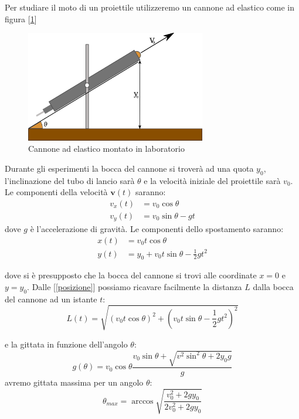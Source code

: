 \documentclass[a4paper,10pt,oneside]{article}
\begin{document}
Per studiare il moto di un proiettile utilizzeremo un cannone ad elastico come in figura [\ref{fig:cannone1}]
\begin{figure}[H]
 \centering
 \includegraphics[width=0.7\textwidth]{./Immagini/cannone.png}
 \caption{Cannone ad elastico montato in laboratorio}
 \label{fig:cannone1}
\end{figure}
Durante gli esperimenti la bocca del cannone si troverà ad una quota $y_0$, l'inclinazione del tubo di lancio sarà $\theta$ e la velocità iniziale del proiettile sarà $v_0$. Le componenti della velocità $\mathbf{v}(t)$ saranno:
\begin{align}
 v_x(t)&=v_0\cos \theta\\
 v_y(t)&=v_0\sin\theta -gt
\end{align}
dove $g$ è l'accelerazione di gravità. Le componenti dello spostamento saranno:
\begin{align}\label{posizione}
 x(t)&=v_0t\cos\theta\\
 y(t)&=y_0+v_0t\sin \theta -\frac{1}{2} g t^2
\end{align}

dove si è presupposto che la bocca del cannone si trovi alle coordinate $x=0$ e $y=y_0$. Dalle [\ref{posizione}] possiamo ricavare facilmente la distanza $L$ dalla bocca del cannone ad un istante $t$:
\begin{equation}
 L(t)=\sqrt{(v_0 t\cos\theta )^2+(v_0t \sin \theta-\frac 1 2 g t^2)^2}
\end{equation}

e la gittata in  funzione dell'angolo $\theta$:
\begin{equation}
 g(\theta)=v_0\cos \theta\frac{v_0\sin\theta+\sqrt{v^2\sin^2\theta+2 y_0 g}}{g}
\end{equation}
avremo gittata massima per un angolo $\theta$:
\begin{equation}
 \theta_{max}=\arccos\sqrt{\frac{v_0^2+2gy_0}{2v_0^2+2gy_0}}
\end{equation}
\end{document}
